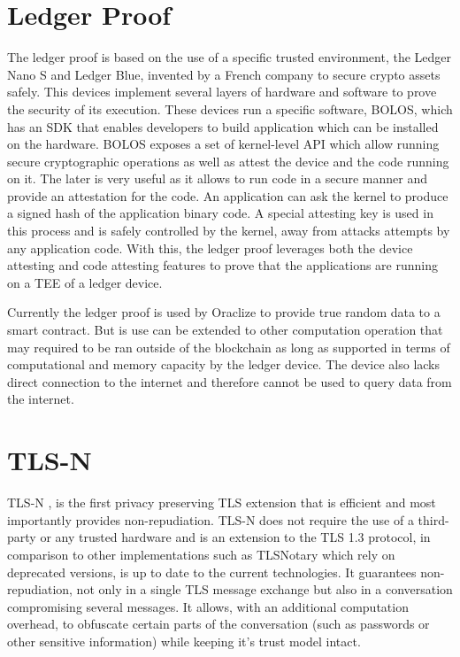 \section{Ledger Proof}
The ledger proof is based on the use of a specific trusted environment, the Ledger Nano S and Ledger Blue, invented by a French company to secure crypto assets safely. This devices implement several layers of hardware and software to prove the security of its execution. These devices run a specific software, BOLOS, which has an SDK that enables developers to build application which can be installed on the hardware. BOLOS exposes a set of kernel-level API which allow running secure cryptographic operations as well as attest the device and the code running on it. The later is very useful as it allows to run code in a secure manner and provide an attestation for the code. An application can ask the kernel to produce a signed hash of the application binary code. A special attesting key is used in this process and is safely controlled by the kernel, away from attacks attempts by any application code. With this, the ledger proof leverages both the device attesting and code attesting features to prove that the applications are running on a TEE of a ledger device.

Currently the ledger proof is used by Oraclize to provide true random data to a smart contract. But is use can be extended to other computation operation that may required to be ran outside of the blockchain as long as supported in terms of computational and memory capacity by the ledger device. The device also lacks direct connection to the internet and therefore cannot be used to query data from the internet.


\section{TLS-N}
TLS-N \cite{Ritzdorf2017}, is the first privacy preserving TLS extension that is efficient and most importantly provides non-repudiation. TLS-N does not require the use of a third-party or any trusted hardware and is an extension to the TLS 1.3 protocol, in comparison to other implementations such as TLSNotary which rely on deprecated versions, is up to date to the current technologies.
It guarantees non-repudiation, not only in a single TLS message exchange but also in a conversation compromising several messages. It allows, with an additional computation overhead, to obfuscate certain parts of the conversation (such as passwords or other sensitive information) while keeping it's trust model intact.

